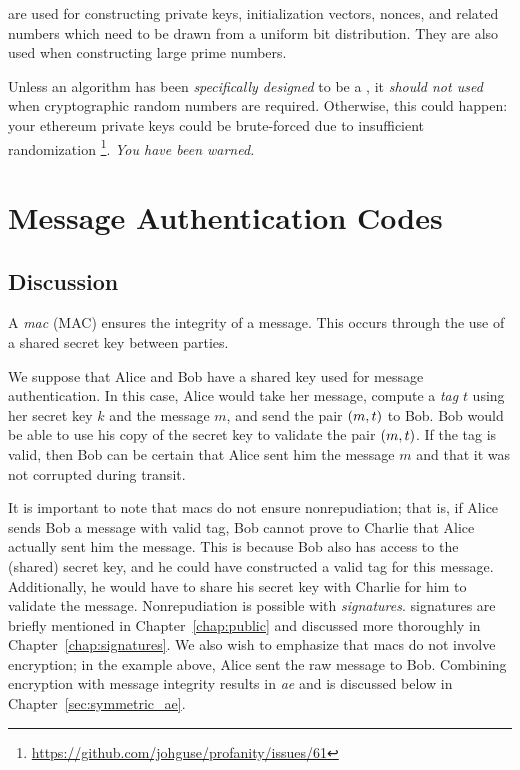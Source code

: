  are used for constructing private keys,
\glspl{initialization vector}, \glspl{nonce},
and related numbers which need to be drawn from a uniform bit distribution.
They are also used when constructing large prime numbers.

Unless an algorithm has been \emph{specifically designed} to be a
,
it \emph{should not used} when cryptographic random numbers are required.
Otherwise, this could happen:
your \gls{ethereum} private keys could be brute-forced due to
insufficient randomization%
\footnote{\url{https://github.com/johguse/profanity/issues/61}}.
\emph{You have been warned.}





\section{Message Authentication Codes}
\label{sec:symmetric_mac}

\subsection{Discussion}

A \emph{\gls{mac}} (MAC) ensures the integrity
of a message.
This occurs through the use of a shared secret key between parties.

We suppose that Alice and Bob have a shared key used for
message authentication.
In this case, Alice would take her message,
compute a \emph{tag} $t$ using her secret key $k$ and the message $m$,
and send the pair $\left( m,t \right)$ to Bob.
Bob would be able to use his copy of the secret key to validate
the pair $\left( m,t \right)$.
If the tag is valid, then Bob can be certain that Alice sent him
the message $m$ and that it was not corrupted during transit.

It is important to note that \glspl{mac} do not ensure nonrepudiation;
that is, if Alice sends Bob a message with valid tag,
Bob cannot prove to Charlie that Alice actually sent him the message.
This is because Bob also has access to the (shared) secret key,
and he could have constructed a valid tag for this message.
Additionally, he would have to share his secret key with Charlie
for him to validate the message.
Nonrepudiation is possible with \emph{\glspl{signature}}.
\Glspl{signature} are briefly mentioned in Chapter~\ref{chap:public}
and discussed more thoroughly in Chapter~\ref{chap:signatures}.
We also wish to emphasize that \glspl{mac} do not involve encryption;
in the example above, Alice sent the raw message to Bob.
Combining encryption with message integrity results in
\emph{\gls{ae}} and is discussed
below in Chapter~\ref{sec:symmetric_ae}.

